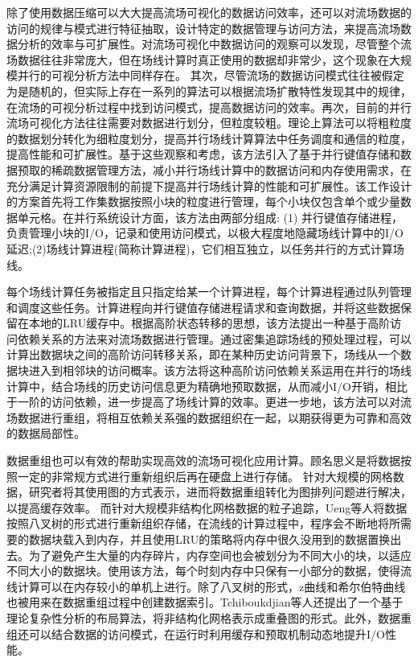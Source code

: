 除了使用数据压缩可以大大提高流场可视化的数据访问效率，还可以对流场数据的访问的规律与模式进行特征抽取，设计特定的数据管理与访问方法，来提高流场数据分析的效率与可扩展性。对流场可视化中数据访问的观察可以发现，尽管整个流场数据往往非常庞大，但在场线计算时真正使用的数据却非常少，这个现象在大规模并行的可视分析方法中同样存在。 其次，尽管流场的数据访问模式往往被假定为是随机的，但实际上存在一系列的算法可以根据流场扩散特性发现其中的规律，在流场的可视分析过程中找到访问模式，提高数据访问的效率。再次，目前的并行流场可视化方法往往需要对数据进行划分，但粒度较粗。理论上算法可以将粗粒度的数据划分转化为细粒度划分，提高并行场线计算算法中任务调度和通信的粒度，提高性能和可扩展性。基于这些观察和考虑，该方法引入了基于并行键值存储和数据预取的稀疏数据管理方法，减小并行场线计算中的数据访问和内存使用需求，在充分满足计算资源限制的前提下提高并行场线计算的性能和可扩展性。该工作设计的方案首先将工作集数据按照小块的粒度进行管理，每个小块仅包含单个或少量数据单元格。在并行系统设计方面，该方法由两部分组成: (1) 并行键值存储进程，负责管理小块的I/O，记录和使用访问模式，以极大程度地隐藏场线计算中的I/O延迟;(2)场线计算进程(简称计算进程)，它们相互独立，以任务并行的方式计算场线。

每个场线计算任务被指定且只指定给某一个计算进程，每个计算进程通过队列管理和调度这些任务。计算进程向并行键值存储进程请求和查询数据，并将这些数据保留在本地的LRU缓存中。根据高阶状态转移的思想，该方法提出一种基于高阶访问依赖关系的方法来对流场数据进行管理。通过密集追踪场线的预处理过程，可以计算出数据块之间的高阶访问转移关系，即在某种历史访问背景下，场线从一个数据块进入到相邻块的访问概率。该方法将这种高阶访问依赖关系运用在并行的场线计算中，结合场线的历史访问信息更为精确地预取数据，从而减小I/O开销，相比于一阶的访问依赖，进一步提高了场线计算的效率。更进一步地，该方法可以对流场数据进行重组，将相互依赖关系强的数据组织在一起，以期获得更为可靠和高效的数据局部性。

数据重组也可以有效的帮助实现高效的流场可视化应用计算。顾名思义是将数据按照一定的非常规方式进行重新组织后再在硬盘上进行存储。
针对大规模的网格数据，研究者将其使用图的方式表示，进而将数据重组转化为图排列问题进行解决，以提高缓存效率\parencite{BogomjakovG01,KarniBG02,YoonLPM05,YoonL06}。
而针对大规模非结构化网格数据的粒子追踪，Ueng等人\parencite{UengSM97}将数据按照八叉树的形式进行重新组织存储，在流线的计算过程中，程序会不断地将所需要的数据块载入到内存，并且使用LRU的策略将内存中很久没用到的数据置换出去。为了避免产生大量的内存碎片，内存空间也会被划分为不同大小的块，以适应不同大小的数据块。使用该方法，每个时刻内存中只保有一小部分的数据，使得流线计算可以在内存较小的单机上进行。除了八叉树的形式，z曲线和希尔伯特曲线也被用来在数据重组过程中创建数据索引\parencite{PascucciF01,NiedermeierS96}。Tchiboukdjian等人\parencite{TchiboukdjianDR10}还提出了一个基于理论复杂性分析的布局算法，将非结构化网格表示成重叠图的形式。此外，数据重组还可以结合数据的访问模式，在运行时利用缓存和预取机制动态地提升I/O性能\parencite{AkandeR13}。

